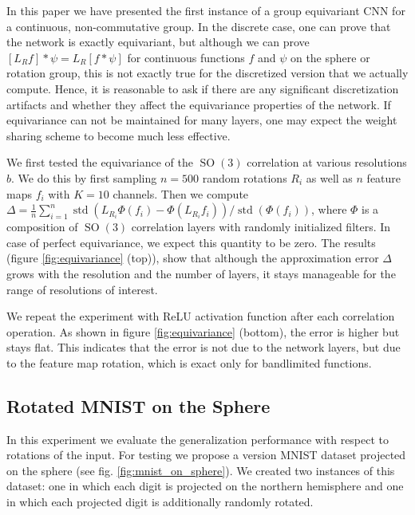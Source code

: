 \documentclass{article} %
\newcommand{\SO}[1]{\ensuremath{\operatorname{SO}(#1)}}
\begin{document}
In this paper we have presented the first instance of a group equivariant CNN for a continuous, non-commutative group.
In the discrete case, one can prove that the network is exactly equivariant, but although we can prove $[L_R f] * \psi = L_R [f * \psi]$ for continuous functions $f$ and $\psi$ on the sphere or rotation group, this is not exactly true for the discretized version that we actually compute.
Hence, it is reasonable to ask if there are any significant discretization artifacts and whether they affect the equivariance properties of the network.
If equivariance can not be maintained for many layers, one may expect the weight sharing scheme to become much less effective.

We first tested the equivariance of the $\SO3$ correlation at various resolutions $b$.
We do this by first sampling $n=500$ random rotations $R_i$ as well as $n$ feature maps $f_i$ with $K=10$ channels.
Then we compute $\Delta = \frac{1}{n}\sum_{i=1}^n \operatorname{std}(L_{R_i} \Phi(f_i) - \Phi(L_{R_i} f_i)) / \operatorname{std}(\Phi(f_i))$, where $\Phi$ is a composition of $\SO3$ correlation layers with randomly initialized filters.
In case of perfect equivariance, we expect this quantity to be zero.
The results (figure \ref{fig:equivariance} (top)), show that although the approximation error $\Delta$ grows with the resolution and the number of layers, it stays manageable for the range of resolutions of interest.

We repeat the experiment with ReLU activation function after each correlation operation.
As shown in figure \ref{fig:equivariance} (bottom), the error is higher but stays flat.
This indicates that the error is not due to the network layers, but due to the feature map rotation, which is exact only for bandlimited functions.

\subsection{Rotated MNIST on the Sphere}

\label{sec:mnist-experiment}

In this experiment we evaluate the generalization performance with respect to rotations of the input. For testing we propose a version MNIST dataset projected on the sphere (see fig. \ref{fig:mnist_on_sphere}).
We created two instances of this dataset: one in which each digit is projected on the northern hemisphere and one in which each projected digit is additionally randomly rotated.
\end{document}
